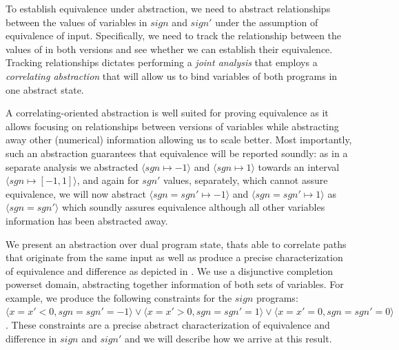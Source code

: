 To establish equivalence under abstraction, we need to abstract relationships between the values of variables in $sign$ and $sign'$ under the assumption of equivalence of input. Specifically, we need to track the relationship between the values of  in both versions and see whether we can establish their equivalence. Tracking relationships dictates performing a \emph{joint analysis} that employs a \emph{correlating abstraction} that will allow us to bind variables of both programs in one abstract state.

A correlating-oriented abstraction is well suited for proving equivalence as it allows focusing on relationships between versions of variables while abstracting away other (numerical) information allowing us to scale better. Most importantly, such an abstraction guarantees that equivalence will be reported soundly: as in a separate analysis we abstracted $\langle sgn \mapsto -1 \rangle$ and $\langle sgn \mapsto 1 \rangle$ towards an interval $\langle sgn \mapsto [-1,1] \rangle$, and again for $sgn'$ values, separately, which cannot assure equivalence, we will now abstract $\langle sgn = sgn' \mapsto -1 \rangle$ and $\langle sgn = sgn' \mapsto 1 \rangle$ as $\langle sgn = sgn' \rangle$ which soundly assures equivalence although all other variables information has been abstracted away.


We present an abstraction over dual program state, thats able to correlate paths that originate from the same input as well as produce a precise characterization of equivalence and difference as depicted in . We use a disjunctive completion powerset domain, abstracting together information of both sets of variables. For example, we produce the following constraints for the $sign$ programs: $\langle x = x' < 0, sgn = sgn' = -1 \rangle \vee \langle x = x' > 0, sgn = sgn' = 1 \rangle \vee \langle x = x' = 0, sgn = sgn' = 0 \rangle$. These constraints are a precise abstract characterization of equivalence and difference in $sign$ and $sign'$ and we will describe how we arrive at this result.

